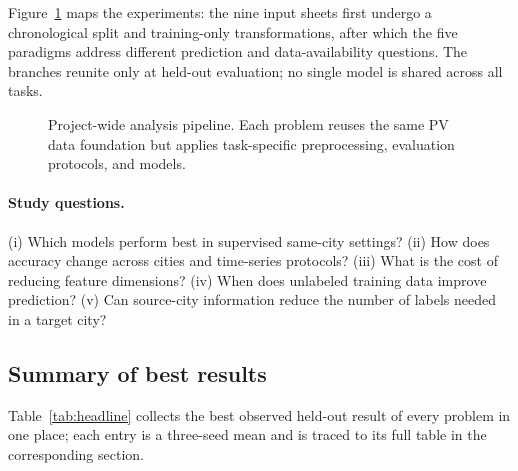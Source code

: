 \documentclass[11pt,letterpaper]{article}
\newcommand{\tikzfit}[1]{\resizebox{\textwidth}{!}{}}
\begin{document}
Figure~\ref{fig:overall} maps the experiments: the nine input sheets first undergo a chronological
split and training-only transformations, after which the five paradigms address different
prediction and data-availability questions. The branches reunite only at held-out evaluation; no
single model is shared across all tasks.

\begin{figure}[!htbp]\centering
\tikzfit{overall_workflow}
\caption{Project-wide analysis pipeline. Each problem reuses the same PV data foundation but applies task-specific preprocessing, evaluation protocols, and models.}\label{fig:overall}
\end{figure}

\paragraph{Study questions.} (i) Which models perform best in supervised same-city settings?
(ii) How does accuracy change across cities and time-series protocols? (iii) What is
the cost of reducing feature dimensions? (iv) When does unlabeled training data improve prediction?
(v) Can source-city information reduce the number of labels needed in a target city?

\subsection{Summary of best results}
Table~\ref{tab:headline} collects the best observed held-out result of every problem in one
place; each entry is a three-seed mean and is traced to its full table in the corresponding
section.
\end{document}
